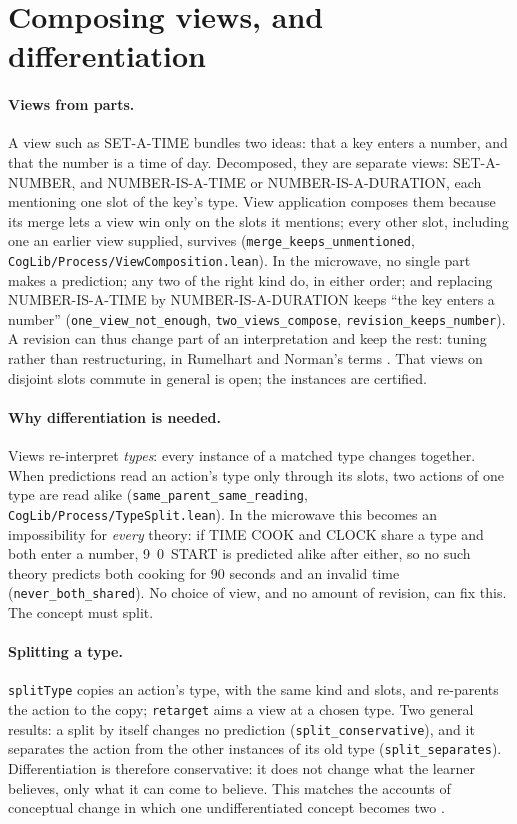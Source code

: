 \documentclass[11pt]{article}
\newcommand{\code}[1]{\texttt{#1}}
\newcommand{\lean}[1]{\texttt{#1}}
\begin{document}
\section{Composing views, and differentiation}
\label{sec:diff}

\paragraph{Views from parts.} A view such as SET-A-TIME bundles two ideas: that a key enters a number, and that the number is a time of day. Decomposed, they are separate views: SET-A-NUMBER, and NUMBER-IS-A-TIME or NUMBER-IS-A-DURATION, each mentioning one slot of the key's type. View application composes them because its merge lets a view win only on the slots it mentions; every other slot, including one an earlier view supplied, survives (\lean{merge\_keeps\_unmentioned}, \code{CogLib/Process/ViewComposition.lean}). In the microwave, no single part makes a prediction; any two of the right kind do, in either order; and replacing NUMBER-IS-A-TIME by NUMBER-IS-A-DURATION keeps ``the key enters a number'' (\lean{one\_view\_not\_enough}, \lean{two\_views\_compose}, \lean{revision\_keeps\_number}). A revision can thus change part of an interpretation and keep the rest: tuning rather than restructuring, in Rumelhart and Norman's terms \citep{rumelhart1976}. That views on disjoint slots commute in general is open; the instances are certified.

\paragraph{Why differentiation is needed.} Views re-interpret \emph{types}: every instance of a matched type changes together. When predictions read an action's type only through its slots, two actions of one type are read alike (\lean{same\_parent\_same\_reading}, \code{CogLib/Process/TypeSplit.lean}). In the microwave this becomes an impossibility for \emph{every} theory: if TIME COOK and CLOCK share a type and both enter a number, 9~0~START is predicted alike after either, so no such theory predicts both cooking for 90 seconds and an invalid time (\lean{never\_both\_shared}). No choice of view, and no amount of revision, can fix this. The concept must split.

\paragraph{Splitting a type.} \code{splitType} copies an action's type, with the same kind and slots, and re-parents the action to the copy; \code{retarget} aims a view at a chosen type. Two general results: a split by itself changes no prediction (\lean{split\_conservative}), and it separates the action from the other instances of its old type (\lean{split\_separates}). Differentiation is therefore conservative: it does not change what the learner believes, only what it can come to believe. This matches the accounts of conceptual change in which one undifferentiated concept becomes two \citep{carey1985,thagard1992}.
\end{document}

